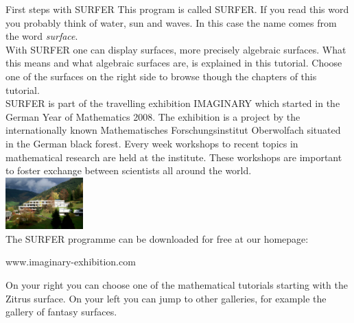 \begin{surferIntroPage}{First steps with SURFER}
This program is called SURFER. If you read this word you probably think of water, sun and waves. In this case the name comes from the word {\it surface}.
\\
With SURFER one can display surfaces, more precisely algebraic surfaces. What this means and what algebraic surfaces are, is explained in this tutorial. Choose one of the surfaces on the right side to browse though the chapters of this tutorial.\\
SURFER is part of the travelling exhibition IMAGINARY which started in the German Year of Mathematics 2008. The exhibition is a project by the internationally known Mathematisches Forschungsinstitut Oberwolfach situated in the German black forest. Every week workshops to recent topics in mathematical research are held at the institute. These workshops are important to foster exchange between scientists all around the world. \\
\vspace{0.2cm} \hspace{3.5cm}\includegraphics[width=3cm]{./../../common/images/photo_mfo.jpg}\\
The SURFER programme can be downloaded for free at our homepage: \\
\begin{centering}
www.imaginary-exhibition.com\\
\end{centering}
 \vspace{0.2cm}
On your right you can choose one of the mathematical tutorials starting with the Zitrus surface. On your left you can jump to other galleries, for example the gallery of fantasy surfaces.
\end{surferIntroPage}
